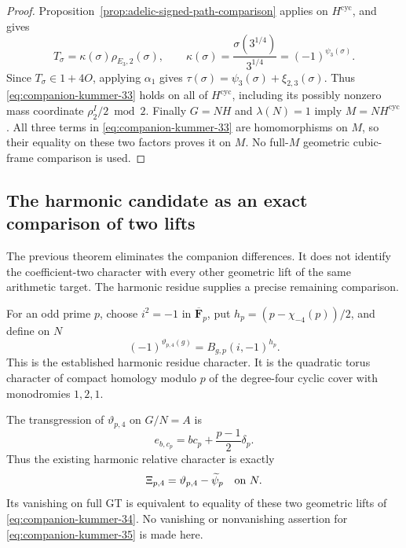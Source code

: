 \begin{proof}
Proposition~\ref{prop:adelic-signed-path-comparison} applies on
\(H^{\mathrm{cyc}}\), and gives
\[
 T_\sigma=\kappa(\sigma)\rho_{E_3,2}(\sigma),\qquad
 \kappa(\sigma)=\frac{\sigma(3^{1/4})}{3^{1/4}}
                         =(-1)^{\psi_3(\sigma)}.
\]
Since \(T_\sigma\in1+4O\), applying \(\alpha_1\) gives
\(\tau(\sigma)=\psi_3(\sigma)+\xi_{2,3}(\sigma)\).
Thus \eqref{eq:companion-kummer-33} holds on all of \(H^{\mathrm{cyc}}\), including
its possibly nonzero mass coordinate \(\rho_2^I/2\bmod2\).
Finally \(G=NH\) and \(\lambda(N)=1\) imply
\(M=N H^{\mathrm{cyc}}\). All three terms in \eqref{eq:companion-kummer-33} are
homomorphisms on \(M\), so their equality on these two
factors proves it on \(M\). No full-\(M\) geometric
cubic-frame comparison is used.
\end{proof}

\subsection{The harmonic candidate as an exact comparison of two lifts}

The previous theorem eliminates the companion differences. It does
not identify the coefficient-two character with every other geometric
lift of the same arithmetic target. The harmonic residue supplies
a precise remaining comparison.

For an odd prime \(p\), choose \(i^2=-1\) in
\(\overline{\mathbf F}_p\), put
\(h_p=(p-\chi_{-4}(p))/2\), and define on \(N\)
\[
 (-1)^{\vartheta_{p,4}(g)}=B_{g,p}(i,-1)^{h_p}.
\]
This is the established harmonic residue character. It is the
quadratic torus character of compact homology modulo \(p\) of
the degree-four cyclic cover with monodromies \(1,2,1\).

\begin{proposition}\label{prop:harmonic-two-geometric-lifts}
The transgression of \(\vartheta_{p,4}\) on \(G/N=A\) is
\begin{equation}
                  e_{b,c_p}=b c_p+\frac{p-1}{2}\delta_p.
\label{eq:companion-kummer-34}
\end{equation}
Thus the existing harmonic relative character is exactly
\begin{equation}
                  \Xi_{p,4}
                     =\vartheta_{p,4}-\widetilde\psi_p
                         \quad\hbox{on }N.               
\label{eq:companion-kummer-35}
\end{equation}
Its vanishing on full GT is equivalent to equality of these two
geometric lifts of \eqref{eq:companion-kummer-34}. No vanishing or nonvanishing assertion
for \eqref{eq:companion-kummer-35} is made here.
\end{proposition}

